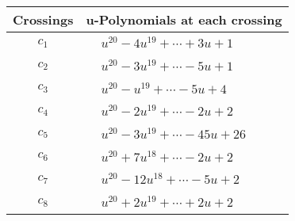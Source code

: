 \documentclass[1p]{elsarticle_modified}
\theoremstyle{definition}
\begin{document}
\begin{tabular}{m{50pt}|m{274pt}}
Crossings & \hspace{64pt}u-Polynomials at each crossing \\
\hline $$\begin{aligned}c_{1}\end{aligned}$$&$\begin{aligned}
&u^{20}-4 u^{19}+\cdots+3 u+1
\end{aligned}$\\
\hline $$\begin{aligned}c_{2}\end{aligned}$$&$\begin{aligned}
&u^{20}-3 u^{19}+\cdots-5 u+1
\end{aligned}$\\
\hline $$\begin{aligned}c_{3}\end{aligned}$$&$\begin{aligned}
&u^{20}- u^{19}+\cdots-5 u+4
\end{aligned}$\\
\hline $$\begin{aligned}c_{4}\end{aligned}$$&$\begin{aligned}
&u^{20}-2 u^{19}+\cdots-2 u+2
\end{aligned}$\\
\hline $$\begin{aligned}c_{5}\end{aligned}$$&$\begin{aligned}
&u^{20}-3 u^{19}+\cdots-45 u+26
\end{aligned}$\\
\hline $$\begin{aligned}c_{6}\end{aligned}$$&$\begin{aligned}
&u^{20}+7 u^{18}+\cdots-2 u+2
\end{aligned}$\\
\hline $$\begin{aligned}c_{7}\end{aligned}$$&$\begin{aligned}
&u^{20}-12 u^{18}+\cdots-5 u+2
\end{aligned}$\\
\hline $$\begin{aligned}c_{8}\end{aligned}$$&$\begin{aligned}
&u^{20}+2 u^{19}+\cdots+2 u+2
\end{aligned}$\\

\end{tabular}
\end{document}
